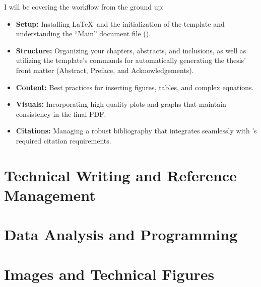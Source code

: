 \documentclass[
	oneside,
	chapterbib,
	saychapapp,
	simpleheaders,
	colourlinks]{ualberta}
\begin{document}
	I will be covering the workflow from the ground up:
	\begin{itemize}
			\item \textbf{Setup:} Installing \LaTeX\ and the initialization of the template and understanding the \enquote{Main} document file ().
			\item \textbf{Structure:} Organizing your chapters, abstracts, and inclusions, as well as utilizing the template's commands for automatically generating the thesis' front matter (Abstract, Preface, and Acknowledgements).
			\item \textbf{Content:} Best practices for inserting figures, tables, and complex equations.
			\item \textbf{Visuals:} Incorporating high-quality plots and graphs that maintain consistency in the final PDF.
			\item \textbf{Citations:} Managing a robust bibliography that integrates seamlessly with \University's required citation requirements.
	\end{itemize}


\part{Technical Writing and Reference Management}\label{prt:technicalwriting}
	

\part{Data Analysis and Programming}\label{prt:dataandprog}



\part{Images and Technical Figures}\label{prt:imgsandfigs}
\end{document}
